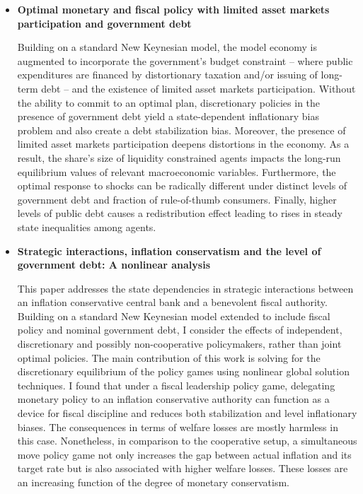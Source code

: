

\begin{itemize}
    \item \textbf{Optimal monetary and fiscal policy with limited asset markets participation and government debt}

    \small{Building on a standard New Keynesian model, the model economy is augmented to incorporate the government's budget constraint -- where public expenditures are financed by distortionary taxation and/or issuing of long-term debt -- and the existence of limited asset markets participation. Without the ability to commit to an optimal plan, discretionary policies in the presence of government debt yield a state-dependent inflationary bias problem and also create a debt stabilization bias. Moreover, the presence of limited asset markets participation deepens distortions in the economy. As a result, the share's size of liquidity constrained agents impacts the long-run equilibrium values of relevant macroeconomic variables. Furthermore, the optimal response to shocks can be radically different under distinct levels of government debt  and fraction of rule-of-thumb consumers. Finally, higher levels of public debt causes a redistribution effect leading to rises in steady state inequalities among agents.}

\item{\textbf{Strategic interactions, inflation conservatism and the level of government debt: A nonlinear analysis}

\small{This paper addresses the state dependencies in strategic interactions between an inflation conservative central bank and a benevolent fiscal authority. Building on a standard New Keynesian model extended to include fiscal policy and nominal government debt, I consider the effects of independent, discretionary and possibly non-cooperative policymakers, rather than joint optimal policies. The main contribution of this work is solving for the discretionary equilibrium of the policy games using nonlinear global solution techniques. I found that under a fiscal leadership policy game, delegating monetary policy to an inflation conservative authority can function as a device for fiscal discipline and reduces both stabilization and level inflationary biases. The consequences in terms of welfare losses are mostly harmless in this case. Nonetheless, in comparison to the cooperative setup, a simultaneous move policy game not only increases the gap between actual inflation and its target rate but is also associated with higher welfare losses. These losses are an increasing function of the degree of monetary conservatism.}}
\end{itemize}